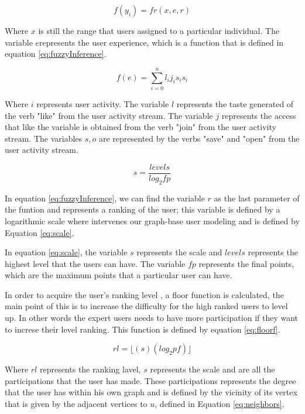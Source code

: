 \begin{equation}\label{eq:fuzzyInference}
\displaystyle f(y_i)= fr(x, e, r)
\end{equation}

Where $x$ is still the range that users assigned to a particular individual. The variable $e$represents the user experience, which is a function that is defined in equation \ref{eq:fuzzyInference}.

\begin{equation}\label{eq:userEperience}
\displaystyle f(e) = \sum_{i=0}^{n}l_{i}j_{i}s_{i}s_{i}
\end{equation}

Where $i$ represents user activity. The variable $l$ represents the taste generated of the verb "like" from the user activity stream.
The variable  $j$ represents the access that like the variable  is obtained from the verb "join" from the user activity stream. The variables $s, o$ are represented by the verbs "save" and "open" from the user activity stream.

\begin{equation}\label{eq:scale}
\displaystyle s =\frac{levels}{log_{2}fp}
\end{equation}

In equation \ref{eq:fuzzyInference}, we can find the variable $r$ as the last parameter of the funtion and represents a ranking of the user; this variable is defined by a logarithmic scale where intervenes our graph-base user modeling  and is defined by Equation \ref{eq:scale}.

In equation \ref{eq:scale}, the variable $s$ represents the scale and $levels$ represents the highest level that the users can have. The variable $fp$ represents the final points, which are the maximum points that a particular user can have.

In order to acquire the user's ranking level , a floor function  is calculated, the main point of this is to increase the difficulty for the high ranked users to level up. In other words the expert users needs to have more participation if they want to increse their level ranking. This function is defined by equation \ref{eq:floorf}.

\begin{equation}\label{eq:floorf}
\displaystyle rl=\lfloor(s)(log_2pf)\rfloor
\end{equation}

Where $rl$ represents the ranking lavel, $s$ represents the scale and  are all the participations  that the user has made. These participations represents the degree that the user has within his own graph and is defined by the vicinity of its vertex  that is given by the adjacent vertices to $u$, defined in Equation \ref{eq:neighbors}.

